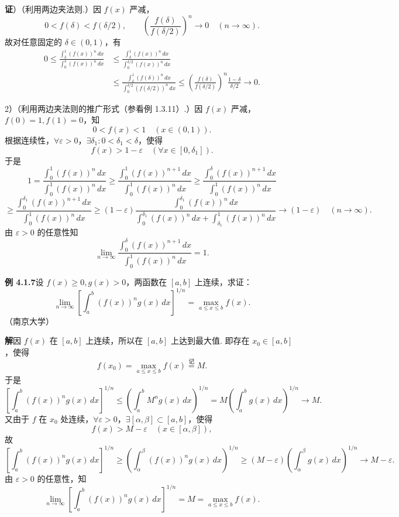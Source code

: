 \documentclass[UTF8, 12pt, fontset=fandol, oneside]{ctexart}
\begin{document}
\noindent\textbf{证}）（利用两边夹法则.）因 $f(x)$ 严减，
\[
0<f(\delta)<f(\delta/2),\qquad
\left(\frac{f(\delta)}{f(\delta/2)}\right)^n\to0\quad(n\to\infty).
\]
故对任意固定的 $\delta\in(0,1)$，有
\[
\begin{aligned}
0\le\frac{\displaystyle\int_\delta^1(f(x))^n\,dx}
{\displaystyle\int_0^\delta(f(x))^n\,dx}
&\le
\frac{\displaystyle\int_\delta^1(f(x))^n\,dx}
{\displaystyle\int_0^{\delta/2}(f(x))^n\,dx}\\
&\le
\frac{\displaystyle\int_\delta^1(f(\delta))^n\,dx}
{\displaystyle\int_0^{\delta/2}(f(\delta/2))^n\,dx}
\le
\left(\frac{f(\delta)}{f(\delta/2)}\right)^n\frac{1-\delta}{\delta/2}\to0.
\end{aligned}
\]

2）（利用两边夹法则的推广形式（参看例 1.3.11）.）因 $f(x)$ 严减，$f(0)=1,f(1)=0$，知
\[
0<f(x)<1\quad(x\in(0,1)).
\]
根据连续性，$\forall\varepsilon>0$，$\exists\delta_1:0<\delta_1<\delta$，使得
\[
f(x)>1-\varepsilon\quad(\forall x\in[0,\delta_1]).
\]
于是
\[
1=\frac{\displaystyle\int_0^1(f(x))^n\,dx}
{\displaystyle\int_0^1(f(x))^n\,dx}
\ge
\frac{\displaystyle\int_0^1(f(x))^{n+1}\,dx}
{\displaystyle\int_0^1(f(x))^n\,dx}
\ge
\frac{\displaystyle\int_0^\delta(f(x))^{n+1}\,dx}
{\displaystyle\int_0^1(f(x))^n\,dx}
\]
\[
\ge
\frac{\displaystyle\int_0^{\delta_1}(f(x))^{n+1}\,dx}
{\displaystyle\int_0^1(f(x))^n\,dx}
\ge
(1-\varepsilon)
\frac{\displaystyle\int_0^{\delta_1}(f(x))^n\,dx}
{\displaystyle\int_0^{\delta_1}(f(x))^n\,dx+
\displaystyle\int_{\delta_1}^1(f(x))^n\,dx}
\to(1-\varepsilon)\quad(n\to\infty).
\]
由 $\varepsilon>0$ 的任意性知
\[
\lim_{n\to\infty}
\frac{\displaystyle\int_0^\delta(f(x))^{n+1}\,dx}
{\displaystyle\int_0^1(f(x))^n\,dx}=1.
\]

\noindent\textbf{例 4.1.7}\quad 设 $f(x)\ge0,g(x)>0$，两函数在 $[a,b]$ 上连续，求证：
\[
\lim_{n\to\infty}
\left[\int_a^b(f(x))^n g(x)\,dx\right]^{1/n}
=\max_{a\le x\le b}f(x).
\]
（南京大学）

\noindent\textbf{解}\quad 因 $f(x)$ 在 $[a,b]$ 上连续，所以在 $[a,b]$ 上达到最大值. 即存在 $x_0\in[a,b]$，使得
\[
f(x_0)=\max_{a\le x\le b}f(x)\stackrel{\text{记}}{=}M.
\]
于是
\[
\left[\int_a^b(f(x))^n g(x)\,dx\right]^{1/n}
\le \left(\int_a^b M^n g(x)\,dx\right)^{1/n}
=M\left(\int_a^b g(x)\,dx\right)^{1/n}\to M.
\]
又由于 $f$ 在 $x_0$ 处连续，$\forall\varepsilon>0$，$\exists[\alpha,\beta]\subset[a,b]$，使得
\[
f(x)>M-\varepsilon\quad(x\in[\alpha,\beta]),
\]
故
\[
\left[\int_a^b(f(x))^n g(x)\,dx\right]^{1/n}
\ge \left(\int_\alpha^\beta(f(x))^n g(x)\,dx\right)^{1/n}
\ge (M-\varepsilon)\left(\int_\alpha^\beta g(x)\,dx\right)^{1/n}
\to M-\varepsilon.
\]
由 $\varepsilon>0$ 的任意性，知
\[
\lim_{n\to\infty}
\left[\int_a^b(f(x))^n g(x)\,dx\right]^{1/n}
=M=\max_{a\le x\le b}f(x).
\]
\end{document}
